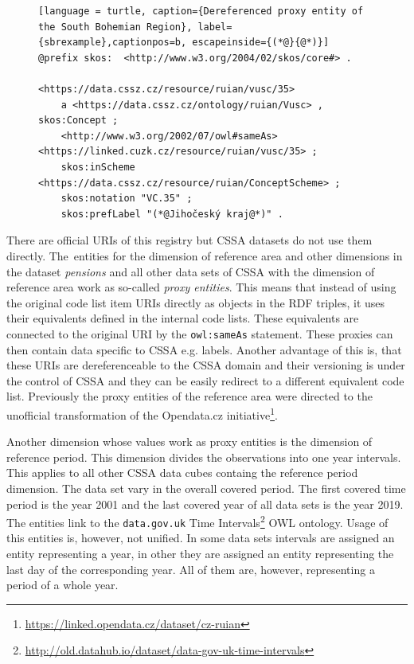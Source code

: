 \begin{figure}[h]
\begin{lstlisting}[language = turtle, caption={Dereferenced proxy entity of the South Bohemian Region}, label={sbrexample},captionpos=b, escapeinside={(*@}{@*)}]
@prefix skos:  <http://www.w3.org/2004/02/skos/core#> .

<https://data.cssz.cz/resource/ruian/vusc/35>
    a <https://data.cssz.cz/ontology/ruian/Vusc> , skos:Concept ;
    <http://www.w3.org/2002/07/owl#sameAs> <https://linked.cuzk.cz/resource/ruian/vusc/35> ;
    skos:inScheme  <https://data.cssz.cz/resource/ruian/ConceptScheme> ;
    skos:notation "VC.35" ;
    skos:prefLabel "(*@Jihočeský kraj@*)" .
\end{lstlisting}
\end{figure}

There are official URIs of this registry but CSSA datasets do not use them directly. The~entities for the dimension of reference area and other dimensions in the dataset \textit{pensions} and all other data sets of CSSA with the dimension of reference area work as so-called \textit{proxy entities}. This means that instead of using the original code list item URIs directly as objects in the RDF triples,  it uses their equivalents defined in the internal code lists. These equivalents are connected to the original URI by the \verb|owl:sameAs| statement. These proxies can then contain data specific to CSSA e.g. labels. Another advantage of this is, that these URIs are dereferenceable to the CSSA domain and their versioning is under the control of CSSA and they can be easily redirect to a different equivalent code list. Previously the proxy entities of the reference area were directed to the unofficial transformation of the Opendata.cz initiative\footnote{\href{https://linked.opendata.cz/dataset/cz-ruian}{https://linked.opendata.cz/dataset/cz-ruian}}.

Another dimension whose values work as proxy entities is the dimension of reference period. This dimension divides the observations into one year intervals. This applies to all other CSSA data cubes containg the reference period dimension. The data set vary in the overall covered period. The first covered time period is the year 2001 and the last covered year of all data sets is the year 2019. The entities link to the \verb|data.gov.uk| Time Intervals\footnote{\href{http://old.datahub.io/dataset/data-gov-uk-time-intervals}{http://old.datahub.io/dataset/data-gov-uk-time-intervals}} OWL ontology. Usage of this entities is, however, not unified. In some data sets intervals are assigned an entity representing a year, in other they are assigned an entity representing the last day of the corresponding year. All of them are, however, representing a period of a whole year.

